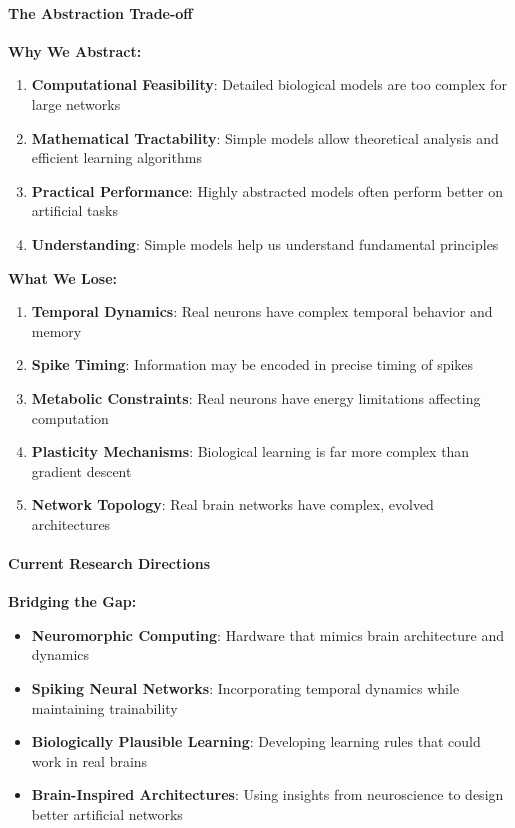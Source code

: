 \paragraph{The Abstraction Trade-off}

\textbf{Why We Abstract:}

\begin{enumerate}
\item \textbf{Computational Feasibility}: Detailed biological models are too complex for large networks
\item \textbf{Mathematical Tractability}: Simple models allow theoretical analysis and efficient learning algorithms
\item \textbf{Practical Performance}: Highly abstracted models often perform better on artificial tasks
\item \textbf{Understanding}: Simple models help us understand fundamental principles
\end{enumerate}

\textbf{What We Lose:}

\begin{enumerate}
\item \textbf{Temporal Dynamics}: Real neurons have complex temporal behavior and memory
\item \textbf{Spike Timing}: Information may be encoded in precise timing of spikes
\item \textbf{Metabolic Constraints}: Real neurons have energy limitations affecting computation
\item \textbf{Plasticity Mechanisms}: Biological learning is far more complex than gradient descent
\item \textbf{Network Topology}: Real brain networks have complex, evolved architectures
\end{enumerate}

\paragraph{Current Research Directions}

\textbf{Bridging the Gap:}

\begin{itemize}
\item \textbf{Neuromorphic Computing}: Hardware that mimics brain architecture and dynamics
\item \textbf{Spiking Neural Networks}: Incorporating temporal dynamics while maintaining trainability
\item \textbf{Biologically Plausible Learning}: Developing learning rules that could work in real brains
\item \textbf{Brain-Inspired Architectures}: Using insights from neuroscience to design better artificial networks
\end{itemize}

